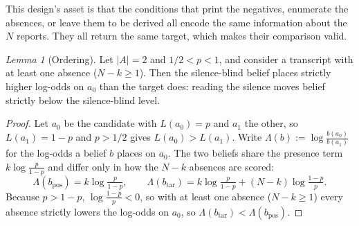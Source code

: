 \documentclass{article}
\theoremstyle{plain}
\theoremstyle{definition}
\theoremstyle{remark}
\newtheorem{lemma}{Lemma}
\newcommand{\bpos}{b_{\mathrm{pos}}}
\newcommand{\btar}{b_{\mathrm{tar}}}         %
\begin{document}
This design's asset is that the conditions that print the negatives, enumerate
the absences, or leave them to be derived all encode the same information about the $N$
reports. They all return the same target, which makes their comparison valid. 
\\
\begin{lemma}[Ordering]\label{lem:order}
Let $|A| = 2$ and $1/2 < p < 1$, and consider a transcript with at least one
absence ($N - k \ge 1$). Then the silence-blind belief places strictly higher
log-odds on $a_0$ than the target does: reading the silence moves belief strictly
below the silence-blind level.
\end{lemma}
\begin{proof}
Let $a_0$ be the candidate with $L(a_0)=p$ and $a_1$ the other, so $L(a_1)=1-p$
and $p>1/2$ gives $L(a_0)>L(a_1)$. Write $\Lambda(b):=\log\frac{b(a_0)}{b(a_1)}$
for the log-odds a belief $b$ places on $a_0$. The two beliefs share the
presence term $k\log\frac{p}{1-p}$ and differ only in how the $N-k$
absences are scored:
\[
  \Lambda(\bpos) = k\log\tfrac{p}{1-p}, \qquad
  \Lambda(\btar) = k\log\tfrac{p}{1-p} + (N-k)\log\tfrac{1-p}{p}.
\]
Because $p>1-p$, $\log\frac{1-p}{p}<0$, so with at least one absence
($N-k\ge1$) every absence strictly lowers the log-odds on $a_0$, so
$\Lambda(\btar)<\Lambda(\bpos)$.
\end{proof}
\end{document}
